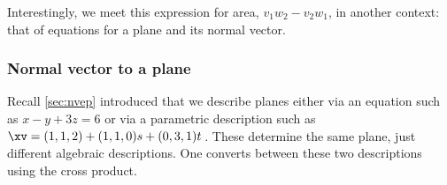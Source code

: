 Interestingly, we meet this expression for area, \(v_1w_2-v_2w_1\), in another context: that of equations for a plane and its normal vector.





\subsubsection{Normal vector to a plane}
Recall \autoref{sec:nvep} introduced that we describe planes either via an equation such as \(x-y+3z=6\) or via a parametric description such as \(\xv=(1,1,2)+(1,1,0)s+(0,3,1)t\)\,.
These determine the same plane, just different algebraic descriptions.
One converts between these two descriptions using the cross product.




